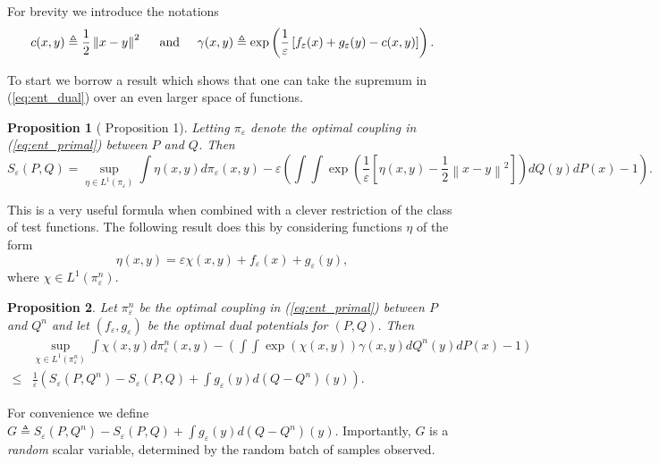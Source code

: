 \documentclass{article}
\newtheorem{proposition}{Proposition}
\theoremstyle{definition}
\newcommand{\feps}{f_\varepsilon}
\newcommand{\geps}{g_\varepsilon}
\newcommand{\norm}[1]{\left\lVert#1\right\rVert}
\begin{document}
For brevity we introduce the notations
$$
    c(x,y) \triangleq \frac{1}{2}\norm{x-y}^2 \hspace{0.5cm} \text{and} \hspace{0.5cm}
    \gamma(x,y) \triangleq \exp\left ( \frac{1}{\varepsilon} \left [ \feps(x) + \geps(y) - c(x,y) \right ] \right ).
$$

To start we borrow a result which shows that one can take the supremum in (\ref{eq:ent_dual}) over an even larger space of functions.
\begin{proposition}[\cite{pooladian2021entropic} Proposition 1] \label{prop:eta_dual}
Letting $\pi_\varepsilon$ denote the optimal coupling in (\ref{eq:ent_primal}) between $P$ and $Q$. Then 
\begin{equation*} %
    S_\varepsilon(P,Q) = \sup_{\eta \in L^1(\pi_\varepsilon)} \int \eta(x,y) d\pi_\varepsilon(x,y) - \varepsilon \left ( \int \int \exp\left( \frac{1}{\varepsilon} \left[\eta(x,y) - \frac{1}{2}\norm{x-y}^2 \right ] \right )dQ(y)dP(x) - 1 \right ).
\end{equation*}
\end{proposition}
This is a very useful formula when combined with a clever restriction of the class of test functions. The following result does this by considering functions $\eta$ of the form
$$
\eta(x,y) = \varepsilon\chi(x,y) + \feps(x) + \geps(y),
$$
where $\chi \in L^1(\pi_\varepsilon^n)$. 
\begin{proposition}  \label{prop:dual_prop}
Let $\pi_\varepsilon^n$ be the optimal coupling in (\ref{eq:ent_primal}) between $P$ and $Q^n$ and let $(\feps, \geps)$ be the optimal dual potentials for $(P,Q)$. Then
\begin{align*}
    &\sup_{\chi \in L^1(\pi_\varepsilon^n)} \int \chi(x,y) d\pi_\varepsilon^n(x,y) - \left (\int\int \exp(\chi(x,y))\gamma(x,y) dQ^n(y)dP(x) - 1 \right ) \nonumber \\
    \leq &\frac{1}{\varepsilon}\left(S_\varepsilon(P,Q^n) - S_\varepsilon(P,Q) + \int \geps(y) d(Q-Q^n)(y)\right).
\end{align*}
\end{proposition}
For convenience we define $G \triangleq S_\varepsilon(P,Q^n) - S_\varepsilon(P,Q) + \int \geps(y) d(Q-Q^n)(y).$  Importantly, $G$ is a \textit{random} scalar variable, determined by the random batch of samples observed.
\end{document}
